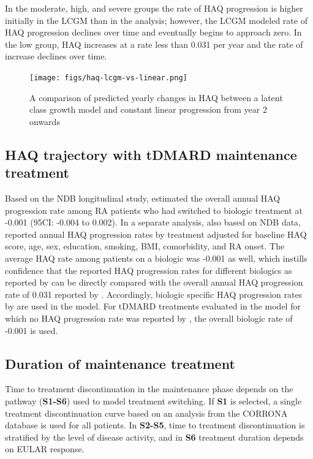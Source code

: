 \documentclass[11pt,final,fleqn]{article}
\theoremstyle{plain}
\begin{document}
In the moderate, high, and severe groups the rate of HAQ progression is higher initially in the LCGM than in the \citet{wolfe2010loss} analysis; however, the LCGM modeled rate of HAQ progression declines over time and eventually begins to approach zero. In the low group, HAQ increases at a rate less than 0.031 per year and the rate of increase declines over time. 

\begin{figure}[H]
\centering
\texttt{[image: figs/haq-lcgm-vs-linear.png]}
\caption{A comparison of predicted yearly changes in HAQ between a latent class growth model and constant linear progression from year 2 onwards}\label{fig:lcgm-vs-linear}
\end{figure}

\subsection{HAQ trajectory with tDMARD maintenance treatment}
Based on the NDB longitudinal study, \citet{wolfe2010loss} estimated the overall annual HAQ progression rate among RA patients who had switched to biologic treatment at -0.001 (95CI: -0.004 to 0.002). In a separate analysis, also based on NDB data, \citet{michaud2011treatment} reported annual HAQ progression rates by treatment adjusted for baseline HAQ score, age, sex, education, smoking, BMI, comorbidity, and RA onset. The average HAQ rate among patients on a biologic was -0.001 as well, which instills confidence that the reported HAQ progression rates for different biologics as reported by \citet{michaud2011treatment} can be directly compared with the overall annual HAQ progression rate of 0.031 reported by \citet{wolfe2010loss}. Accordingly, biologic specific HAQ progression rates by \citet{michaud2011treatment} are used in the model. For tDMARD treatments evaluated in the model for which no HAQ progression rate was reported by \citet{michaud2011treatment}, the overall biologic rate of -0.001 is used. 

\subsection{Duration of maintenance treatment}\label{duration-of-maintenance-treatment}
Time to treatment discontinuation in the maintenance phase depends on the pathway (\textbf{S1-S6}) used to model treatment switching. If \textbf{S1} is selected, a single treatment discontinuation curve based on an analysis from the CORRONA database is used for all patients. In \textbf{S2-S5}, time to treatment discontinuation is stratified by the level of disease activity, and in \textbf{S6} treatment duration depends on EULAR response.  
\end{document}
